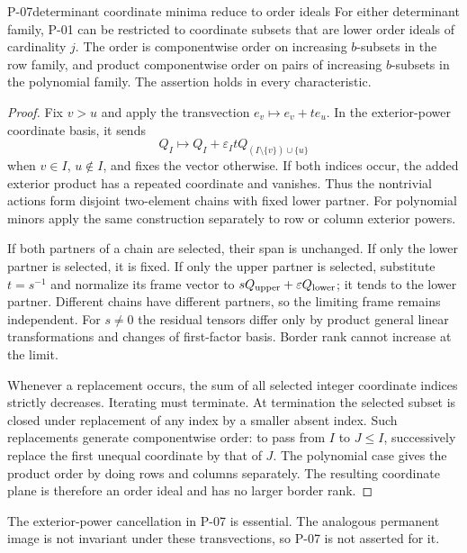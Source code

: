 \begin{finding}{P-07}{determinant coordinate minima reduce to order ideals}
For either determinant family, P-01 can be restricted to
coordinate subsets that are lower order ideals of cardinality
\(j\). The order is componentwise order on increasing
\(b\)-subsets in the row family, and product componentwise
order on pairs of increasing \(b\)-subsets in the polynomial
family. The assertion holds in every characteristic.
\end{finding}
\begin{proof}
Fix \(v>u\) and apply the transvection
\(e_v\mapsto e_v+t e_u\). In the exterior-power coordinate
basis, it sends
\[
 Q_I\longmapsto Q_I+\varepsilon_I t
 Q_{(I\setminus\{v\})\cup\{u\}}
\]
when \(v\in I\), \(u\notin I\), and fixes the vector
otherwise. If both indices occur, the added exterior
product has a repeated coordinate and vanishes. Thus the
nontrivial actions form disjoint two-element chains
with fixed lower partner. For polynomial minors apply
the same construction separately to row or column
exterior powers.

If both partners of a chain are selected, their span is
unchanged. If only the lower partner is selected, it is
fixed. If only the upper partner is selected, substitute
\(t=s^{-1}\) and normalize its frame vector to
\(sQ_{\rm upper}+\varepsilon Q_{\rm lower}\); it tends to
the lower partner. Different chains have different
partners, so the limiting frame remains independent.
For \(s\ne0\) the residual tensors differ only by product
general linear transformations and changes of first-factor
basis. Border rank cannot increase at the limit.

Whenever a replacement occurs, the sum of all selected
integer coordinate indices strictly decreases. Iterating
must terminate. At termination the selected subset is
closed under replacement of any index by a smaller absent
index. Such replacements generate componentwise order:
to pass from \(I\) to \(J\leq I\), successively replace the
first unequal coordinate by that of \(J\). The polynomial
case gives the product order by doing rows and columns
separately. The resulting coordinate plane is therefore
an order ideal and has no larger border rank.
\end{proof}

The exterior-power cancellation in P-07 is essential.
The analogous permanent image is not invariant under
these transvections, so P-07 is not asserted for it.

